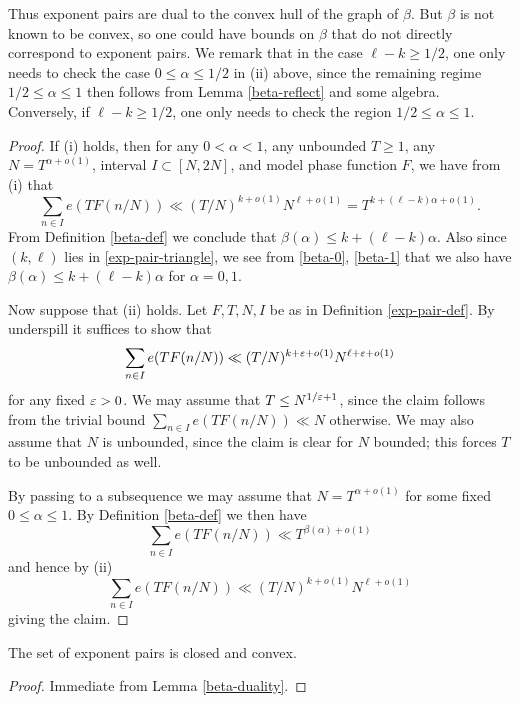 
Thus exponent pairs are dual to the convex hull of the graph of $\beta$.  But $\beta$ is not known to be convex, so one could have bounds on $\beta$ that do not directly correspond to exponent pairs.  We remark that in the case $\ell - k \geq 1/2$, one only needs to check the case $0 \leq \alpha \leq 1/2$ in (ii) above, since the remaining regime $1/2 \leq \alpha \leq 1$ then follows from Lemma \ref{beta-reflect} and some algebra.  Conversely, if $\ell - k \geq 1/2$, one only needs to check the region $1/2 \leq \alpha \leq 1$.

\begin{proof}  If (i) holds, then for any $0 < \alpha < 1$, any unbounded $T \geq 1$, any $N = T^{\alpha+o(1)}$, interval $I \subset [N,2N]$, and model phase function $F$, we have from (i) that
$$ \sum_{n \in I} e(T F(n/N)) \ll (T/N)^{k+o(1)} N^{\ell+o(1)} = T^{k + (\ell-k)\alpha + o(1)}.$$
From Definition \ref{beta-def} we conclude that $\beta(\alpha) \leq k + (\ell-k) \alpha$.  Also since $(k,\ell)$ lies in \eqref{exp-pair-triangle}, we see from \eqref{beta-0}, \eqref{beta-1} that we also have $\beta(\alpha) \leq k + (\ell-k) \alpha$ for $\alpha=0,1$.

Now suppose that (ii) holds.  Let $F, T, N, I$ be as in Definition \ref{exp-pair-def}.  By underspill it suffices to show that
$$ \sum_{n \in I} e(T F(n/N)) \ll (T/N)^{k+\varepsilon+o(1)} N^{\ell+\varepsilon+o(1)}$$
for any fixed $\varepsilon>0$.  We may assume that $T \leq N^{1/\varepsilon+1}$, since the claim follows from the trivial bound $\sum_{n \in I} e(T F(n/N)) \ll N$ otherwise.  We may also assume that $N$ is unbounded, since the claim is clear for $N$ bounded; this forces $T$ to be unbounded as well.

By passing to a subsequence we may assume that $N = T^{\alpha+o(1)}$ for some fixed $0 \leq \alpha \leq 1$.  By Definition \ref{beta-def} we then have
$$ \sum_{n \in I} e(T F(n/N)) \ll T^{\beta(\alpha)+o(1)}$$
and hence by (ii)
$$ \sum_{n \in I} e(T F(n/N)) \ll (T/N)^{k+o(1)} N^{\ell+o(1)}$$
giving the claim.
\end{proof}


\begin{corollary}\label{exp-pair-closed} The set of exponent pairs is closed and convex.
\end{corollary}

\begin{proof} Immediate from Lemma \ref{beta-duality}.
\end{proof}

